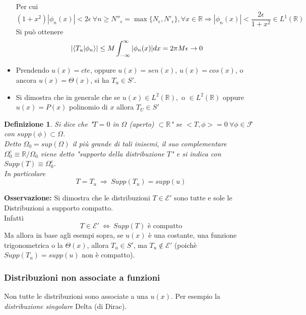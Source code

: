 \documentclass[twoside]{article}
\newtheorem{definition}{Definizione}[section]
\begin{document}
\begin{itemize}
\begin{equation}
    \end{equation}
    Per cui
    \begin{equation}
        (1+x^2)|\phi_n(x)|<2\epsilon\ \forall n\ge N''_\epsilon=\max\{N_\epsilon,N'_\epsilon\}, \forall x\in \mathds{R} \Longrightarrow |\phi_n(x)|<\frac{2\epsilon}{1+x^2}\in L^1(\mathds{R})
    \end{equation}
    Si può ottenere
    \begin{equation}
        \left|\bra{T_u}\ket{\phi_n}\right|\le M\int_{-\infty}^\infty|\phi_n(x)|dx=2\pi M\epsilon \to 0
    \end{equation}
    \item Prendendo $u(x)=cte$, oppure $u(x)=sen(x)$, $u(x)=cos(x)$, o ancora $u(x)=\Theta(x)$, si ha $T_u\in S'$.
    \item Si dimostra che in generale che se $u(x) \in L^2(\mathds{R}),$ o $\in L^2(\mathds{R})$ oppure $u(x)=P(x)$ polinomio di $x$ allora $T_U\in S'$
\end{itemize}

\vspace{0.5 cm}

\begin{definition}
Si dice che "$T=0$ in $\Omega$ (aperto) $\subset \mathds{R}$" se $<T,\phi>=0 \ \forall \phi \in \mathcal{F}$ con $supp(\phi) \subset \Omega$.
\\
Detto $\Omega_0=sup(\Omega)$ il più grande di tali inisemi, il suo complementare $\Omega_0 ^c \equiv \mathds{R}/\Omega_0$ viene detto "supporto della distribuzione $T$" e si indica con $Supp(T)\equiv \Omega_0 ^c$.
\\
In particolare
\begin{equation}
    T=T_u \ \Rightarrow \ Supp(T_u)=supp(u)
\end{equation}
\end{definition}

\textbf{Osservazione:} Si dimostra che le distribuzioni $T \in \mathcal{E}'$ sono tutte e sole le Distribuzioni a supporto compatto.
\\
Infatti 
\begin{equation}
    T \in \mathcal{E}' \ \iff \ Supp(T) \text{ è compatto}
\end{equation}
Ma allora in base agli esempi sopra, se $u(x)$ è una costante, una funzione trigonometrica o la $\Theta(x)$, allora $T_u \in S'$, ma $T_u \notin \mathcal{E}'$ (poichè $Supp(T_u)=supp(u)$ non è compatto).

\subsubsection{Distribuzioni non associate a funzioni}
Non tutte le distribuzioni sono associate a una $u(x)$. Per esempio la \textit{distribuzione singolare} Delta (di Dirac).
\end{document}
